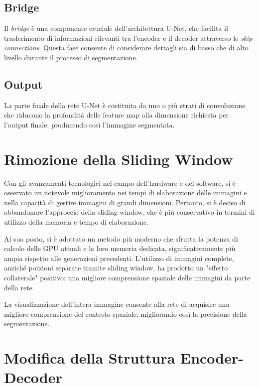 \subsection{Bridge}
\label{sec:Bridge}

Il \textit{bridge} è una componente cruciale dell'architettura U-Net, che facilita il trasferimento
di informazioni rilevanti tra l'encoder e il decoder attraverso le \textit{skip connections}. Questa fase
consente di considerare dettagli sia di basso che di alto livello durante il processo di
segmentazione.

\subsection{Output}
\label{sec:Output}
La parte finale della rete U-Net è costituita da uno o più strati di convoluzione che riducono la
profondità delle feature map alla dimensione richiesta per l'output finale, producendo così
l'immagine segmentata.


\section{Rimozione della Sliding Window}
\label{sub:Rimozione sliding window}

Con gli avanzamenti tecnologici nel campo dell'hardware e del software, si è osservato un notevole
miglioramento nei tempi di elaborazione delle immagini e nella capacità di gestire immagini di
grandi dimensioni. Pertanto, si è deciso di abbandonare l'approccio della sliding window, che è più
conservativo in termini di utilizzo della memoria e tempo di elaborazione.

Al suo posto, si è adottato un metodo più moderno che sfrutta la potenza di calcolo delle GPU
attuali e la loro memoria dedicata, significativamente più ampia rispetto alle generazioni
precedenti. L'utilizzo di immagini complete, anziché porzioni separate tramite sliding window, ha
prodotto un "effetto collaterale" positivo: una migliore comprensione spaziale delle immagini da
parte della rete.

La visualizzazione dell'intera immagine consente alla rete di acquisire una migliore comprensione
del contesto spaziale, migliorando così la precisione della segmentazione.


\section{Modifica della Struttura Encoder-Decoder}
\label{sub:Modifica Encoder-Decoder}

